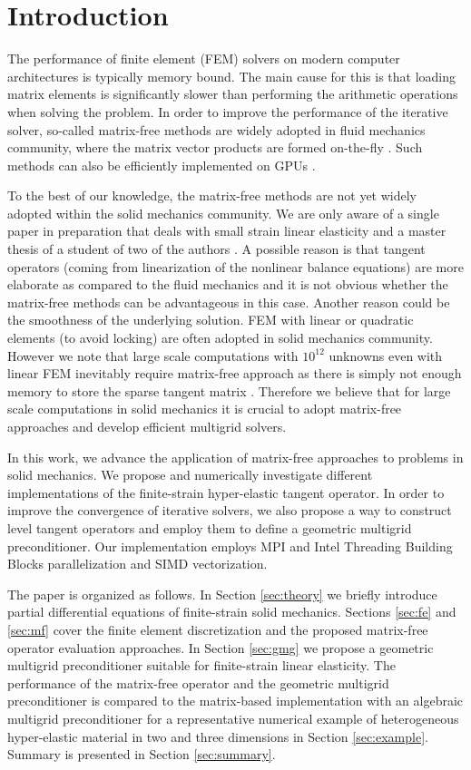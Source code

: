 \documentclass[preprint,12pt,times]{elsarticle}
\begin{document}
\section{Introduction}

The performance of finite element (FEM) solvers on modern computer architectures is typically memory bound.
The main cause for this is that loading matrix elements is significantly slower than performing the arithmetic operations when solving the problem.
In order to improve the performance of the iterative solver, so-called matrix-free methods are
widely adopted in fluid mechanics community, where the matrix vector products are formed on-the-fly \cite{kronbichler12,May2015, Krank2017, Brown2010, Gmeiner2016}. Such methods can also be efficiently implemented on GPUs \cite{Abdelfattah2016}.

To the best of our knowledge, the matrix-free methods are not yet widely adopted within the solid mechanics community.
We are only aware of a single paper in preparation that deals with small strain linear elasticity \cite{Clevenger2018} and a master thesis of a student of two of the authors \cite{Mentler2017}.
A possible reason is that tangent operators (coming from linearization of the nonlinear balance equations) are
more elaborate as compared to the fluid mechanics and it is not obvious whether the matrix-free methods can be advantageous in this case. Another reason could be the smoothness of the underlying solution. FEM with linear or quadratic elements (to avoid locking) are often adopted in solid mechanics community. However we note that large scale computations with $10^{12}$ unknowns even with linear FEM inevitably require matrix-free approach as there is simply not enough memory to store the sparse tangent matrix \cite{Gmeiner2016}. Therefore we believe that for large scale computations in solid mechanics it is crucial to adopt matrix-free approaches and develop efficient multigrid solvers.

In this work, we advance the application of matrix-free approaches to problems in solid mechanics.
We propose and numerically investigate different implementations of the finite-strain hyper-elastic tangent operator.
In order to improve the convergence of iterative solvers, we also propose a way to construct level tangent operators
and employ them to define a geometric multigrid preconditioner.
Our implementation employs MPI and Intel Threading Building Blocks parallelization and SIMD vectorization.

The paper is organized as follows. In Section \ref{sec:theory} we briefly introduce partial differential equations of finite-strain solid mechanics. Sections \ref{sec:fe} and \ref{sec:mf} cover the finite element discretization and the proposed matrix-free operator evaluation approaches. In Section \ref{sec:gmg} we propose a geometric multigrid preconditioner suitable for finite-strain linear elasticity. The performance of the matrix-free operator and the geometric multigrid preconditioner is compared to the matrix-based implementation with an algebraic multigrid preconditioner for a representative numerical example of heterogeneous hyper-elastic material in two and three dimensions in Section \ref{sec:example}. Summary is presented in Section \ref{sec:summary}.
\end{document}
